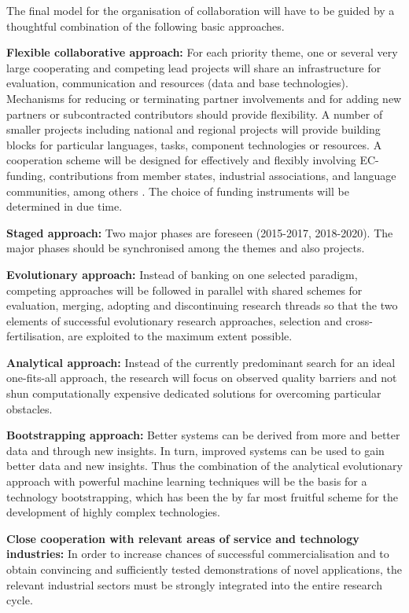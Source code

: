 \documentclass[10pt, plain]{../../metanetpaper}
\begin{document}
\begin{multicols}{2}
The final model for the organisation of collaboration will have to be guided by a thoughtful combination of the following basic approaches.

\textbf{Flexible collaborative approach:} For each priority theme, one or several very large cooperating and competing lead projects will share an infrastructure for evaluation, communication and resources (data and base technologies). Mechanisms for reducing or terminating partner involvements and for adding new partners or subcontracted contributors should provide flexibility. A number of smaller projects including national and regional projects will provide building blocks for particular languages, tasks, component technologies or resources. A cooperation scheme will be designed for effectively and flexibly involving EC-funding, contributions from member states, industrial associations, and language communities, among others \cite{spector2012}. The choice of funding instruments will be determined in due time.

\textbf{Staged approach:} Two major phases are foreseen (2015-2017, 2018-2020). The major phases should be synchronised among the themes and also projects.   

\textbf{Evolutionary approach:} Instead of banking on one selected paradigm, competing approaches will be followed in parallel with shared schemes for evaluation, merging, adopting and discontinuing research threads so that the two elements of successful evolutionary research approaches, selection and cross-fertilisation, are exploited to the maximum extent possible.

\textbf{Analytical approach:} Instead of the currently predominant search for an ideal one-fits-all approach, the research will focus on observed quality barriers and not shun computationally expensive dedicated solutions for overcoming particular obstacles.

\textbf{Bootstrapping approach:} Better systems can be derived from more and better data and through new insights. In turn, improved systems can be used to gain better data and new insights. Thus the combination of the analytical evolutionary approach with powerful machine learning techniques will be the basis for a technology bootstrapping, which has been the by far most fruitful scheme for the development of highly complex technologies.

\textbf{Close cooperation with relevant areas of service and technology industries:} In order to increase chances of successful commercialisation and to obtain convincing and sufficiently tested demonstrations of novel applications, the relevant industrial sectors must be strongly integrated into the entire research cycle.


\end{multicols}
\end{document}
